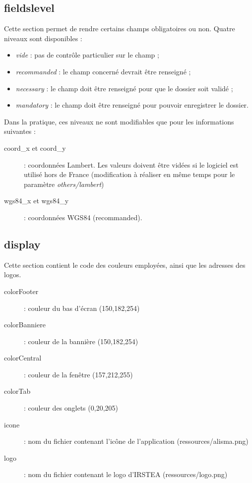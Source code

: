 \subsection{fieldslevel}
Cette section permet de rendre certains champs obligatoires ou non. Quatre niveaux sont disponibles :
\begin{itemize}
\item \textit{vide} : pas de contrôle particulier sur le champ ;
\item \textit{recommanded} : le champ concerné devrait être renseigné ;
\item \textit{necessary} : le champ doit être renseigné pour que le dossier soit validé ;
\item \textit{mandatory} : le champ doit être renseigné pour pouvoir enregistrer le dossier.
\end{itemize}

Dans la pratique, ces niveaux ne sont modifiables que pour les informations suivantes :
\begin{description}
\item [coord\_x et coord\_y] : coordonnées Lambert. Les valeurs doivent être vidées si le logiciel est utilisé hors de France (modification à réaliser en même temps pour le paramètre \textit{others/lambert}) 
\item [wgs84\_x et wgs84\_y] : coordonnées WGS84 (recommanded).
\end{description}

\subsection{display}
Cette section contient le code des couleurs employées, ainsi que les adresses des logos.
\begin{description}
\item [colorFooter] : couleur du bas d'écran (150,182,254)
\item [colorBanniere] : couleur de la bannière (150,182,254)
\item [colorCentral] : couleur de la fenêtre (157,212,255)
\item [colorTab] : couleur des onglets (0,20,205)
\item [icone] : nom du fichier contenant l'icône de l'application (ressources/alisma.png)
\item [logo] : nom du fichier contenant le logo d'IRSTEA (ressources/logo.png)
\end{description}